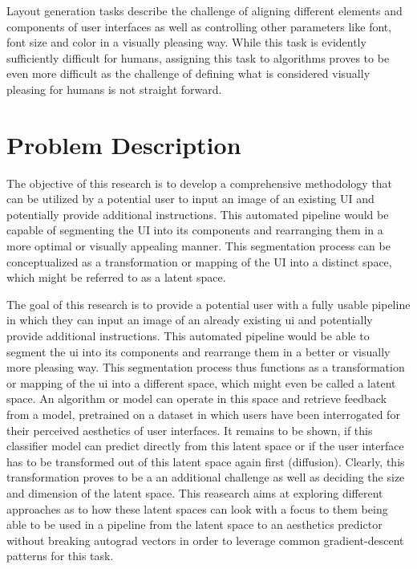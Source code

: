 \documentclass[10pt,a4paper]{scrartcl} %
\begin{document}
Layout generation tasks describe the challenge of aligning different elements and components
of user interfaces as well as controlling other parameters like font, font size and color
in a visually pleasing way. While this task is evidently sufficiently difficult
for humans, assigning this task to algorithms proves to be even more difficult as the challenge
of defining what is considered visually pleasing for humans is not straight forward.

\section{Problem Description}



The objective of this research is to develop a comprehensive methodology that can be utilized by a potential user to input an image of an existing UI and potentially provide additional instructions. This automated pipeline would be capable of segmenting the UI into its components and rearranging them in a more optimal or visually appealing manner. This segmentation process can be conceptualized as a transformation or mapping of the UI into a distinct space, which might be referred to as a latent space. 


The goal of this research is to provide a potential user with a fully usable pipeline in
 which they can input an image of an already existing \ac{ui} and potentially provide 
 additional instructions. This automated pipeline would be able to segment the \ac{ui} into
 its components and rearrange them in a better or visually more pleasing way. This segmentation
 process thus functions as a transformation or mapping of the \ac{ui} into a different space,
 which might even be called a latent space. An algorithm or model can operate in this space
 and retrieve feedback from a model, pretrained on a dataset in which users have been interrogated
 for their perceived aesthetics of user interfaces. It remains to be shown, if this classifier
 model can predict directly from this latent space or if the user interface has to be transformed 
 out of this latent space again first (diffusion). Clearly, this transformation proves to be a an
 additional challenge as well as deciding the size and dimension of the latent space. This reasearch
 aims at exploring different approaches as to how these latent spaces can look with a focus to them
 being able to be used in a pipeline from the latent space to an aesthetics predictor without
 breaking autograd vectors in order to leverage common gradient-descent patterns for this task.
\end{document}
